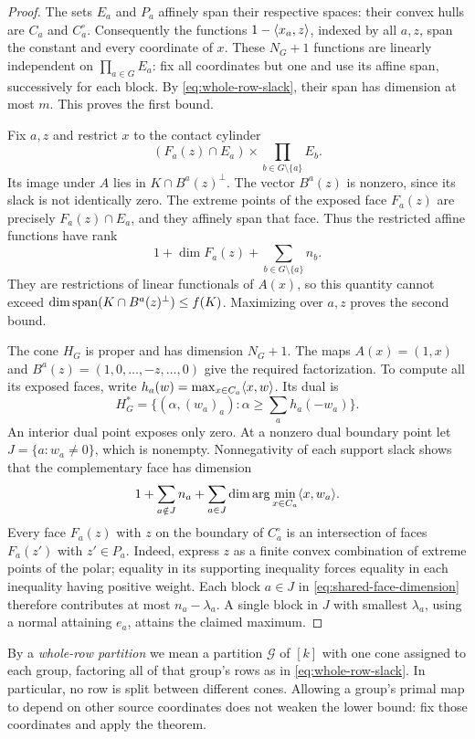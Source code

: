 \begin{proof}
The sets $E_a$ and $P_a$ affinely span their respective spaces: their
convex hulls are $C_a$ and $C_a^\circ$. Consequently the functions
$1-\langle x_a,z\rangle$, indexed by all $a,z$, span the constant and every
coordinate of $x$. These $N_G+1$ functions are linearly independent on
$\prod_{a\in G}E_a$: fix all coordinates but one and use its affine span,
successively for each block. By \eqref{eq:whole-row-slack}, their span
has dimension at most $m$. This proves the first bound.

Fix $a,z$ and restrict $x$ to the contact cylinder
\[
 (F_a(z)\cap E_a)\times\prod_{b\in G\setminus\{a\}}E_b.
\]
Its image under $A$ lies in $K\cap B^a(z)^\perp$. The vector $B^a(z)$
is nonzero, since its slack is not identically zero. The extreme points
of the exposed face $F_a(z)$ are precisely $F_a(z)\cap E_a$, and they
affinely span that face. Thus the restricted affine functions have rank
\[
 1+\dim F_a(z)+\sum_{b\in G\setminus\{a\}}n_b.
\]
They are restrictions of linear functionals of $A(x)$, so this quantity
cannot exceed $\dim\operatorname{span}(K\cap B^a(z)^\perp)\leq f(K)$.
Maximizing over $a,z$ proves the second bound.

The cone $H_G$ is proper and has dimension $N_G+1$. The maps
$A(x)=(1,x)$ and $B^a(z)=(1,0,\ldots,-z,\ldots,0)$ give the required
factorization. To compute all its exposed faces, write
$h_a(w)=\max_{x\in C_a}\langle x,w\rangle$. Its dual is
\[
 H_G^*=\{(\alpha,(w_a)_a):\alpha\geq\sum_a h_a(-w_a)\}.
\]
An interior dual point exposes only zero. At a nonzero dual boundary
point let $J=\{a:w_a\ne0\}$, which is nonempty. Nonnegativity of each
support slack shows that the complementary face has dimension
\begin{equation}\label{eq:shared-face-dimension}
 1+\sum_{a\notin J}n_a+
 \sum_{a\in J}\dim\arg\min_{x\in C_a}\langle x,w_a\rangle.
\end{equation}
Every face $F_a(z)$ with $z$ on the boundary of $C_a^\circ$ is an
intersection of faces $F_a(z')$ with $z'\in P_a$. Indeed, express $z$
as a finite convex combination of extreme points of the polar;
equality in its supporting inequality forces equality in each
inequality having positive weight. Each block $a\in J$ in
\eqref{eq:shared-face-dimension} therefore contributes at most
$n_a-\lambda_a$. A single block in $J$ with smallest $\lambda_a$, using
a normal attaining $e_a$, attains the claimed maximum.
\end{proof}

By a \emph{whole-row partition} we mean a partition $\mathcal G$ of
$[k]$ with one cone assigned to each group, factoring all of that group's
rows as in \eqref{eq:whole-row-slack}. In particular, no row is split
between different cones. Allowing a group's primal map to
depend on other source coordinates does not weaken the lower bound:
fix those coordinates and apply the theorem.

